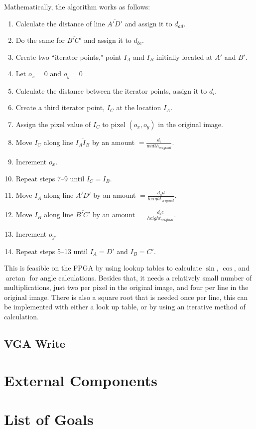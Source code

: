 \documentclass[11pt]{article}
\begin{document}
Mathematically, the algorithm works as follows:
\singlespacing
\begin{enumerate}
\item Calculate the distance of line $\overline{A\prime D\prime}$ and assign it to $d_{ad}$.
\item Do the same for $\overline{B\prime C\prime}$ and assign it to $d_{bc}$.
\item Create two ``iterator points," point $I_A$ and $I_B$ initially located at $A\prime$ and $B\prime$.
\item Let $o_x = 0$ and $o_y = 0$
\item Calculate the distance between the iterator points, assign it to $d_i$.
\item Create a third iterator point, $I_C$ at the location $I_A$.
\item Assign the pixel value of $I_C$ to pixel $(o_x, o_y)$ in the original image.
\item Move $I_C$ along line $\overline{I_A I_B}$ by an amount $= \frac{d_i}{width_{original}}$.
\item Increment $o_x$.
\item Repeat steps 7--9 until $I_C = I_B$.
\item Move $I_A$ along line $\overline{A\prime D\prime}$ by an amount $= \frac{d_ad}{height_{original}}$.
\item Move $I_B$ along line $\overline{B\prime C\prime}$ by an amount $= \frac{d_bc}{height_{original}}$.
\item Increment $o_y$.
\item Repeat steps 5--13 until $I_A = D\prime$ and $I_B = C\prime$.
\end{enumerate}

This is feasible on the FPGA by using lookup tables to calculate $\sin$, $\cos$, and $\arctan$ for angle calculations. Besides that, it needs a relatively small number of multiplications, just two per pixel in the original image, and four per line in the original image. There is also a square root that is needed once per line, this can be implemented with either a look up table, or by using an iterative method of calculation.

\subsection{VGA Write}

\section{External Components}

\section{List of Goals}
\end{document}
